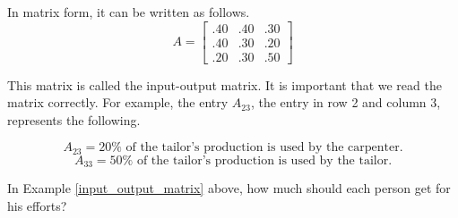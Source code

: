 \begin{solution}
    In matrix form, it can be written as follows.
    \[ A = \begin{bmatrix}
            .40 & .40 & .30 \\
            .40 & .30 & .20 \\
            .20 & .30 & .50
        \end{bmatrix} \]

    This matrix is called the input-output matrix. It is important that we read the matrix correctly. For example, the entry \( A_{23} \), the entry in row 2 and column 3, represents the following.

    \[ A_{23} = 20\% \text{ of the tailor's production is used by the carpenter.} \]
    \[ A_{33} = 50\% \text{ of the tailor's production is used by the tailor.} \]
\end{solution}

\begin{example}
    In Example \ref{input_output_matrix} above, how much should each person get for his efforts?
\end{example}

